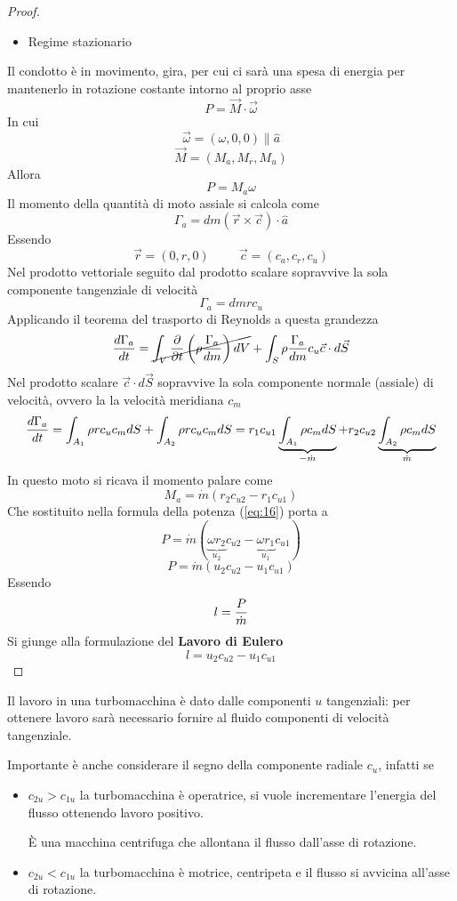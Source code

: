 \documentclass[a4paper, 15pt]{article}
\begin{document}
\begin{adjustwidth}{2in}{}
\begin{proof}
\begin{itemize}
			\item Regime stazionario
		\end{itemize}
		Il condotto è in movimento, gira, per cui ci sarà una spesa di energia per mantenerlo in rotazione costante intorno al proprio asse
		\[P = \vec{M}\cdot\vec{\omega}\]
		In cui 
		\[\vec{\omega} = (\omega, 0, 0) \parallel\hat{a}\]
		\[\vec{M} = (M_a, M_r, M_u)\]
		Allora 
		\begin{equation}\label{eq:16}
			\boxed{P = M_a\omega}
		\end{equation}
		Il momento della quantità di moto assiale si calcola come 
		\[\Gamma_a = dm(\vec{r}\times\vec{c})\cdot\hat{a}\]
		Essendo
		\[\vec{r} = (0, r, 0)\hspace{1cm} \vec{c} = (c_a, c_r, c_u)\]
		Nel prodotto vettoriale seguito dal prodotto scalare sopravvive la sola componente tangenziale di velocità
		\[\Gamma_a = dmrc_u\]
\newpage
		Applicando il teorema del trasporto di Reynolds a questa grandezza
		\[{d\Gamma_a\over dt} = \cancel{\int_V{\partial\over\partial t}\left(\rho{\Gamma_a\over dm}\right)dV} + \int_S \rho{\Gamma_a\over dm}c_u\vec{c}\cdot d\vec{S}\]
		Nel prodotto scalare $ \vec{c}\cdot d\vec{S}$ sopravvive la sola componente normale (assiale) di velocità, ovvero la la velocità meridiana $c_m$
		\[{d\Gamma_a\over dt} = \int_{A_1}\rho rc_uc_mdS + \int_{A_2}\rho rc_uc_mdS = r_1c_{u1}\underbrace{\int_{A_1}\rho c_mdS}_{-\dot{m}} + r_2c_{u2}\underbrace{\int_{A_2}\rho c_mdS}_{\dot{m}}\]
		In questo moto si ricava il momento palare come
		\begin{equation}\label{eq:17}
			\boxed{M_a = \dot{m}(r_2c_{u2}-r_1c_{u1})}
		\end{equation}
		Che sostituito nella formula della potenza (\ref{eq:16}) porta a 
		\[P = \dot{m}(\underbrace{\omega r_2}_{u_2}c_{u2}-\underbrace{\omega r_1}_{u_1}c_{u1})\]
		\[P = \dot{m}(u_2c_{u2} - u_1c_{u1})\]
		Essendo
		\[l = {P\over \dot{m}}\]
		Si giunge alla formulazione del \textbf{Lavoro di Eulero}
		\begin{equation}\label{eq:18}
			\boxed{l = u_2c_{u2} - u_1c_{u1}}
		\end{equation}
	\end{proof}	
		Il lavoro in una turbomacchina è dato dalle componenti $u$ tangenziali: per ottenere lavoro sarà necessario fornire al fluido componenti di velocità tangenziale. \newline 
		
		Importante è anche considerare il segno della componente radiale $c_u$, infatti se 
		\begin{itemize}
			\item $c_{2u}>c_{1u}$ la turbomacchina è operatrice, si vuole incrementare l'energia del flusso ottenendo lavoro positivo. 
			
			È una macchina centrifuga che allontana il flusso dall'asse di rotazione.
			
			\item $c_{2u}<c_{1u}$ la turbomacchina è motrice, centripeta e il flusso si avvicina all'asse di rotazione. 
		\end{itemize}
	\end{adjustwidth}
\end{document}
